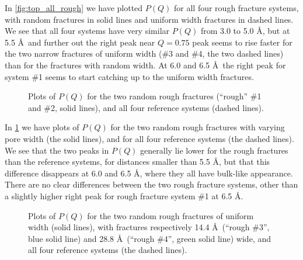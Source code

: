 In \cref{fig:top_all_rough} we have plotted $P(Q)$ for all four rough fracture systems, with random fractures in solid lines and uniform width fractures in dashed lines. We see that all four systems have very similar $P(Q)$ from 3.0 to 5.0 \AA, but at 5.5 \AA\ and further out the right peak near $Q = 0.75$ peak seems to rise faster for the two narrow fractures of uniform width (\#3 and \#4, the two dashed lines) than for the fractures with random width. At 6.0 and 6.5 \AA\ the right peak for system \#1 seems to start catching up to the uniform width fractures.

%
\begin{figure}[!p]%
    \centering%
    \captionsetup{width=\textwidth}%
    \caption{%
        Plots of $P(Q)$ for the two random rough fractures (``rough'' \#1 and \#2, solid lines), and all four reference systems (dashed lines).%
        \label{fig:top_normal_and_reference}%
    }%
\end{figure}%

In \cref{fig:top_normal_and_reference} we have plots of $P(Q)$ for the two random rough fractures with varying pore width (the solid lines), and for all four reference systems (the dashed lines). We see that the two peaks in $P(Q)$ generally lie lower for the rough fractures than the reference systems, for distances smaller than 5.5 \AA, but that this difference disappears at 6.0 and 6.5 \AA, where they all have bulk-like appearance. There are no clear differences between the two rough fracture systems, other than a slightly higher right peak for rough fracture system \#1 at 6.5 \AA.

%
\begin{figure}[!p]%
    \centering%
    \captionsetup{width=\textwidth}%
    \caption{%
        Plots of $P(Q)$ for the two random rough fractures of uniform width (solid lines), with fractures respectively 14.4 \AA\ (``rough \#3'', blue solid line) and 28.8 \AA\ (``rough \#4'', green solid line) wide, and all four reference systems (the dashed lines).%
        \label{fig:top_narrow_and_reference}%
        \label{fig:last_top_figure}%
    }%
\end{figure}%

